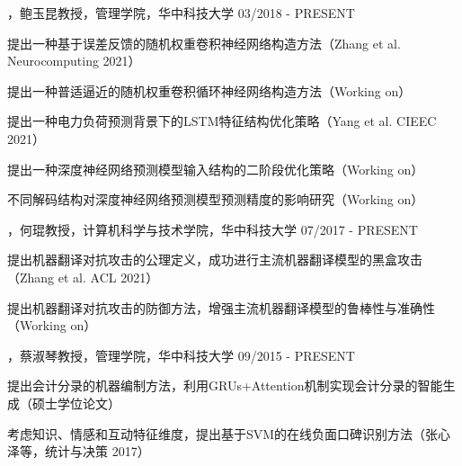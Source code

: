 
\begin{cventries}

\cvexperience
{，鲍玉昆教授，管理学院，华中科技大学}
{03/2018 - PRESENT}
{
    \begin{cvitems}
    \item {提出一种基于误差反馈的随机权重卷积神经网络构造方法（Zhang et al. Neurocomputing 2021）}
    \item {提出一种普适逼近的随机权重卷积循环神经网络构造方法（Working on）}
    \item {提出一种电力负荷预测背景下的LSTM特征结构优化策略（Yang et al. CIEEC 2021）}
    \item {提出一种深度神经网络预测模型输入结构的二阶段优化策略（Working on）}
    \item {不同解码结构对深度神经网络预测模型预测精度的影响研究（Working on）}
    \end{cvitems}
}


\cvexperience
{，何琨教授，计算机科学与技术学院，华中科技大学}
{07/2017 - PRESENT}
{
    \begin{cvitems}
    \item {提出机器翻译对抗攻击的公理定义，成功进行主流机器翻译模型的黑盒攻击（Zhang et al. ACL 2021）}
    \item {提出机器翻译对抗攻击的防御方法，增强主流机器翻译模型的鲁棒性与准确性（Working on）}
    \end{cvitems}
}


\cvexperience
{，蔡淑琴教授，管理学院，华中科技大学}
{09/2015 - PRESENT}
{
    \begin{cvitems}
    \item {提出会计分录的机器编制方法，利用GRUs+Attention机制实现会计分录的智能生成（硕士学位论文）}
    \item {考虑知识、情感和互动特征维度，提出基于SVM的在线负面口碑识别方法（张心泽等，统计与决策 2017）}
    \end{cvitems}
}




\end{cventries}